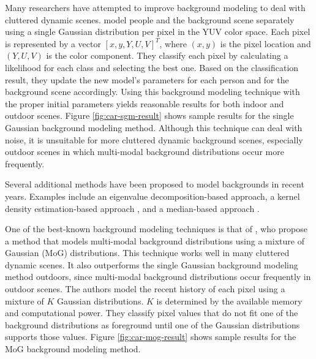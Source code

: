 Many researchers have attempted to improve background modeling to deal
with cluttered dynamic scenes.  model people
and the background scene separately using a single Gaussian
distribution per pixel in the YUV color space. Each pixel is
represented by a vector $[x, y, Y, U, V]^T$, where $(x, y)$ is the
pixel location and $(Y, U, V)$ is the color component. They classify
each pixel by calculating a likelihood for each class and selecting
the best one.  Based on the classification result, they update the new
model's parameters for each person and for the background scene
accordingly.  Using this background modeling technique with the proper
initial parameters yields reasonable results for both indoor and
outdoor scenes. Figure \ref{fig:car-sgm-result} shows sample results
for the single Gaussian background modeling method. Although this
technique can deal with noise, it is unsuitable for more cluttered
dynamic background scenes, especially outdoor scenes in which
multi-modal background distributions occur more frequently.

Several additional methods have been proposed to model backgrounds in
recent years. Examples include an eigenvalue decomposition-based
approach, a kernel density
estimation-based approach , and a
median-based approach .

One of the best-known background modeling techniques is that
of , who propose a method that models
multi-modal background distributions using a mixture of Gaussian (MoG)
distributions. This technique works well in many cluttered dynamic
scenes. It also outperforms the single Gaussian background modeling
method outdoors, since multi-modal background distributions occur
frequently in outdoor scenes. The authors model the recent history of
each pixel using a mixture of $K$ Gaussian distributions. $K$ is
determined by the available memory and computational power. They
classify pixel values that do not fit one of the background
distributions as foreground until one of the Gaussian distributions
supports those values. Figure \ref{fig:car-mog-result} shows sample
results for the MoG background modeling method.

